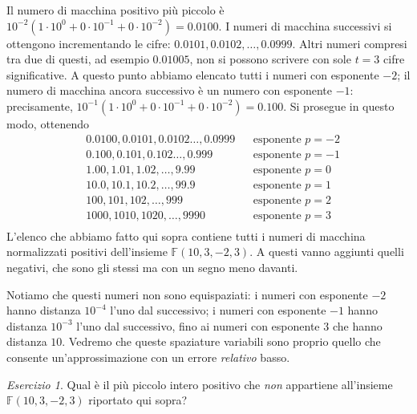 \documentclass[a4paper]{report}
\theoremstyle{definition}
\theoremstyle{remark}
\newtheorem{esercizio}[theorem]{Esercizio}
\begin{document}
Il numero di macchina positivo più piccolo è $10^{-2}(1 \cdot 10^{0} + 0 \cdot 10^{-1} + 0 \cdot 10^{-2}) = 0.0100$. I numeri di macchina successivi si ottengono incrementando le cifre: $0.0101, 0.0102, \dots, 0.0999$. Altri numeri compresi tra due di questi, ad esempio $0.01005$, non si possono scrivere con sole $t=3$ cifre significative. A questo punto abbiamo elencato tutti i numeri con esponente $-2$; il numero di macchina ancora successivo è un numero con esponente $-1$: precisamente, $10^{-1}(1 \cdot 10^{0} + 0 \cdot 10^{-1} + 0 \cdot 10^{-2}) = 0.100$. Si prosegue in questo modo, ottenendo
\begin{align*}
    &0.0100, 0.0101, 0.0102 \dots, 0.0999 & & \text{esponente $p=-2$}\\
    &0.100, 0.101, 0.102 \dots, 0.999 & & \text{esponente $p=-1$}\\
    &1.00, 1.01, 1.02, \dots, 9.99 & & \text{esponente $p=0$}\\
    &10.0, 10.1, 10.2, \dots, 99.9 & & \text{esponente $p=1$}\\
    &100, 101, 102, \dots, 999 & & \text{esponente $p=2$}\\
    &1000, 1010, 1020, \dots, 9990 & & \text{esponente $p=3$}\\
\end{align*}
L'elenco che abbiamo fatto qui sopra contiene tutti i numeri di macchina normalizzati positivi dell'insieme $\mathbb{F}(10, 3, -2, 3)$. A questi vanno aggiunti quelli negativi, che sono gli stessi ma con un segno meno davanti.

Notiamo che questi numeri non sono equispaziati: i numeri con esponente $-2$ hanno distanza $10^{-4}$ l'uno dal successivo; i numeri con esponente $-1$ hanno distanza $10^{-3}$ l'uno dal successivo, fino ai numeri con esponente $3$ che hanno distanza $10$. Vedremo che queste spaziature variabili sono proprio quello che consente un'approssimazione con un errore \emph{relativo} basso.

\begin{esercizio}
    Qual è il più piccolo intero positivo che \emph{non} appartiene all'insieme $\mathbb{F}(10, 3, -2, 3)$ riportato qui sopra?
\end{esercizio}
\end{document}
